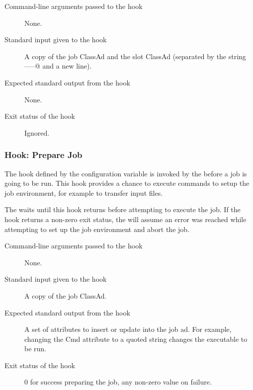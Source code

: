 \begin{description}
\item[Command-line arguments passed to the hook]
  None.

\item[Standard input given to the hook]
  A copy of the job ClassAd and the slot ClassAd
  (separated by the string \verb@-----@ and a new line).

\item[Expected standard output from the hook]
  None.

\item[Exit status of the hook]
  Ignored.
\end{description}


\subsubsection{\label{sec:job-hooks-prepare-job}
Hook: Prepare Job}

The hook defined by the configuration variable
 is invoked by the  before
a job is going to be run.
This hook provides a chance to execute commands to setup the job
environment, for example to transfer input files.

The  waits until this hook returns before
attempting to execute the job.
If the hook returns a non-zero exit status, the  will
assume an error was reached while attempting to set up the job
environment and abort the job.

\begin{description}
\item[Command-line arguments passed to the hook]
  None.

\item[Standard input given to the hook]
  A copy of the job ClassAd.

\item[Expected standard output from the hook]
  A set of attributes to insert or update into the job ad.  For example,
  changing the Cmd attribute to a quoted string changes the executable 
  to be run.

\item[Exit status of the hook]
  0 for success preparing the job, any non-zero value on failure.
\end{description}


